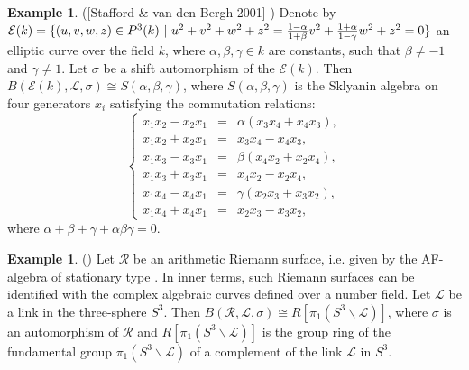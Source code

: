 \documentclass[10pt, reqno]{amsart}
\theoremstyle{definition}
\newtheorem{example}[theorem]{Example}
\theoremstyle{remark}
\numberwithin{equation}{section}
\begin{document}
\begin{example}
([Stafford \& van den Bergh 2001]  \cite[p.197]{StaVdb1})
Denote by 
$\mathcal{E}(k)=\{(u,v,w,z)\in P^3(k) ~|~u^2+v^2+w^2+z^2 =
{1-\alpha\over 1+\beta}v^2+{1+\alpha\over 1-\gamma}w^2+z^2 = 0\}$  
an elliptic curve  over the field $k$,  where $\alpha,\beta,\gamma\in k$
are constants, such that  $\beta\ne -1$ and  $\gamma\ne 1$.
Let  $\sigma$  be a shift automorphism of the $\mathcal{E}(k)$.
Then  $B(\mathcal{E}(k), \mathcal{L}, \sigma)\cong S(\alpha,\beta,\gamma)$,
where   $S(\alpha,\beta,\gamma)$  is  the  Sklyanin algebra on four  generators
$x_i$ satisfying  the commutation relations:
\begin{equation}\label{eq2.4}
\left\{
\begin{array}{ccc}
x_1x_2-x_2x_1 &=& \alpha(x_3x_4+x_4x_3),\\
x_1x_2+x_2x_1 &=& x_3x_4-x_4x_3,\\
x_1x_3-x_3x_1 &=& \beta(x_4x_2+x_2x_4),\\
x_1x_3+x_3x_1 &=& x_4x_2-x_2x_4,\\
x_1x_4-x_4x_1 &=& \gamma(x_2x_3+x_3x_2),\\ 
x_1x_4+x_4x_1 &=& x_2x_3-x_3x_2,
\end{array}
\right.
\end{equation}
where $\alpha+\beta+\gamma+\alpha\beta\gamma=0$.  
\end{example}
\begin{example}\label{ex2.3}
(\cite[Lemma 3.1]{Nik2})
Let $\mathscr{R}$ be an arithmetic Riemann surface, i.e. given by the 
AF-algebra  of stationary type \cite[Section 5.2]{N}. 
In inner terms, such Riemann surfaces can be identified with the complex 
algebraic curves  defined over a number field.
Let $\mathscr{L}$ be a link in the three-sphere $S^3$.  
Then $B(\mathscr{R}, \mathcal{L}, \sigma)\cong R[\pi_1(S^3 \backslash \mathscr{L})]$,
where $\sigma$ is an automorphism of $\mathscr{R}$ and  $R[\pi_1(S^3 \backslash \mathscr{L})]$
is the group ring of the fundamental group $\pi_1(S^3 \backslash \mathscr{L})$  of a complement of the 
link $\mathscr{L}$ in $S^3$. 
\end{example}
\end{document}
